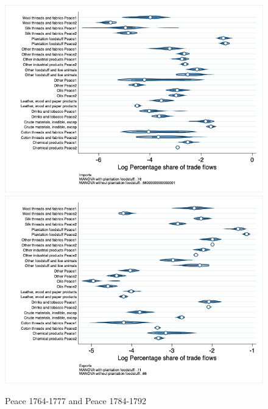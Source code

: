 \documentclass[12pt,a4paper,notitlepage,english]{article}
\begin{document}
\begin{figure}
\centering
\caption{Peace 1764-1777 and Peace 1784-1792}
\label{seven_peace1764_1777_nat_distr}
\includegraphics[scale=.4]{peace1764_1777_peace1784_1792_nat_distr_Isitc}
\includegraphics[scale=.4]{peace1764_1777_peace1784_1792_nat_distr_Xsitc}
\end{figure}

\end{document}
